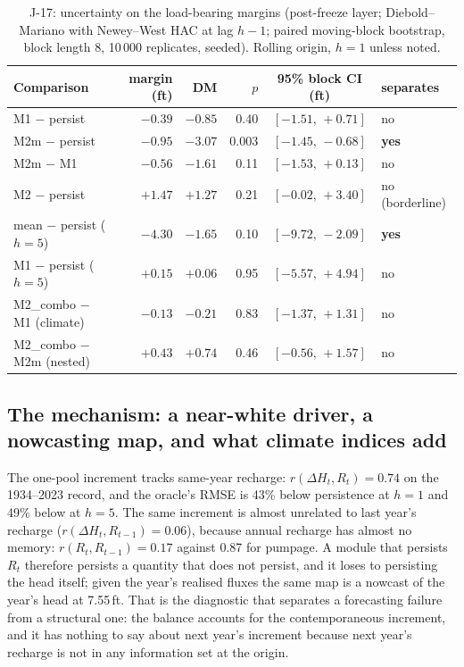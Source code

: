 \documentclass[preprint,11pt,authoryear]{elsarticle}
\theoremstyle{definition}
\theoremstyle{remark}
\begin{document}
\begin{table}[!htb]
\centering\small
\caption{J-17: uncertainty on the load-bearing margins (post-freeze layer; Diebold--Mariano with Newey--West HAC at lag $h-1$; paired moving-block bootstrap, block length 8, 10\,000 replicates, seeded). Rolling origin, $h=1$ unless noted.}
\label{tab:edwdm}
\scriptsize\setlength{\tabcolsep}{3pt}
\begin{tabular}{@{}lrrrcl@{}}
\toprule
Comparison & margin (ft) & DM & $p$ & 95\% block CI (ft) & separates \\
\midrule
M1 $-$ persist & $-0.39$ & $-0.85$ & 0.40 & $[-1.51,\,+0.71]$ & no \\
M2m $-$ persist & $-0.95$ & $-3.07$ & 0.003 & $[-1.45,\,-0.68]$ & \textbf{yes} \\
M2m $-$ M1 & $-0.56$ & $-1.61$ & 0.11 & $[-1.53,\,+0.13]$ & no \\
M2 $-$ persist & $+1.47$ & $+1.27$ & 0.21 & $[-0.02,\,+3.40]$ & no (borderline) \\
mean $-$ persist ($h=5$) & $-4.30$ & $-1.65$ & 0.10 & $[-9.72,\,-2.09]$ & \textbf{yes} \\
M1 $-$ persist ($h=5$) & $+0.15$ & $+0.06$ & 0.95 & $[-5.57,\,+4.94]$ & no \\
M2\_combo $-$ M1 (climate) & $-0.13$ & $-0.21$ & 0.83 & $[-1.37,\,+1.31]$ & no \\
M2\_combo $-$ M2m (nested) & $+0.43$ & $+0.74$ & 0.46 & $[-0.56,\,+1.57]$ & no \\
\bottomrule
\end{tabular}
\end{table}

\FloatBarrier
\subsection{The mechanism: a near-white driver, a nowcasting map, and what climate indices add}\label{sec:edw_mech}

The one-pool increment tracks same-year recharge: $r(\Delta H_t,R_t)=0.74$ on the 1934--2023 record, and the oracle's RMSE is 43\% below persistence at $h=1$ and 49\% below at $h=5$. The same increment is almost unrelated to last year's recharge ($r(\Delta H_t,R_{t-1})=0.06$), because annual recharge has almost no memory: $r(R_t,R_{t-1})=0.17$ against 0.87 for pumpage. A module that persists $R_t$ therefore persists a quantity that does not persist, and it loses to persisting the head itself; given the year's realised fluxes the same map is a nowcast of the year's head at 7.55\,ft. That is the diagnostic that separates a forecasting failure from a structural one: the balance accounts for the contemporaneous increment, and it has nothing to say about next year's increment because next year's recharge is not in any information set at the origin.
\end{document}
